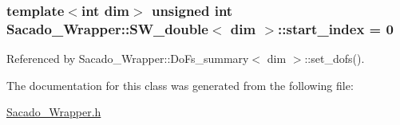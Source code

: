 \subsubsection[{\texorpdfstring{start\+\_\+index}{start_index}}]{\setlength{\rightskip}{0pt plus 5cm}template$<$int dim$>$ unsigned {\bf int} {\bf Sacado\+\_\+\+Wrapper\+::\+S\+W\+\_\+double}$<$ dim $>$\+::start\+\_\+index = 0}\hypertarget{classSacado__Wrapper_1_1SW__double_aa0927ce06528899dd44afe5d770840c1}{}\label{classSacado__Wrapper_1_1SW__double_aa0927ce06528899dd44afe5d770840c1}


Referenced by Sacado\+\_\+\+Wrapper\+::\+Do\+Fs\+\_\+summary$<$ dim $>$\+::set\+\_\+dofs().



The documentation for this class was generated from the following file\+:\begin{DoxyCompactItemize}
\item 
\hyperlink{Sacado__Wrapper_8h}{Sacado\+\_\+\+Wrapper.\+h}\end{DoxyCompactItemize}
